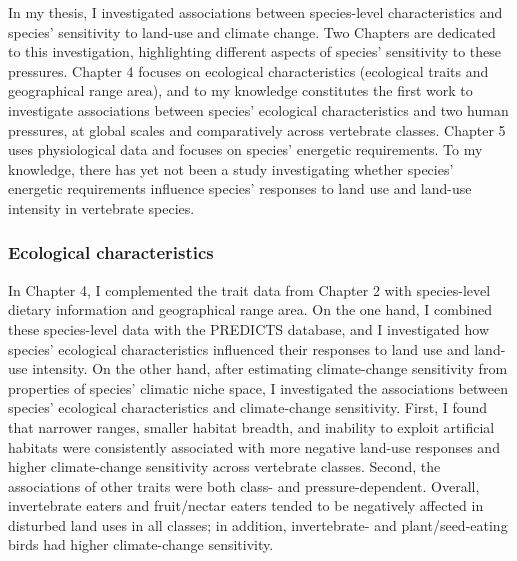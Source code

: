 In my thesis, I investigated associations between species-level characteristics and species' sensitivity to land-use and climate change. Two Chapters are dedicated to this investigation, highlighting different aspects of species' sensitivity to these pressures. Chapter 4 focuses on ecological characteristics (ecological traits and geographical range area), and to my knowledge constitutes the first work to investigate associations between species' ecological characteristics and two human pressures, at global scales and comparatively across vertebrate classes. Chapter 5 uses physiological data and focuses on species' energetic requirements. To my knowledge, there has yet not been a study investigating whether species' energetic requirements influence species' responses to land use and land-use intensity in vertebrate species.

\subsubsection{Ecological characteristics}

In Chapter 4, I complemented the trait data from Chapter 2 with species-level dietary information and geographical range area. On the one hand, I combined these species-level data with the PREDICTS database, and I investigated how species' ecological characteristics influenced their responses to land use and land-use intensity. On the other hand, after estimating climate-change sensitivity from properties of species' climatic niche space, I investigated the associations between species' ecological characteristics and climate-change sensitivity. First, I found that narrower ranges, smaller habitat breadth, and inability to exploit artificial habitats were consistently associated with more negative land-use responses and higher climate-change sensitivity across vertebrate classes. Second, the associations of other traits were both class- and pressure-dependent. Overall, invertebrate eaters and fruit/nectar eaters tended to be negatively affected in disturbed land uses in all classes; in addition, invertebrate- and plant/seed-eating birds had higher climate-change sensitivity.


